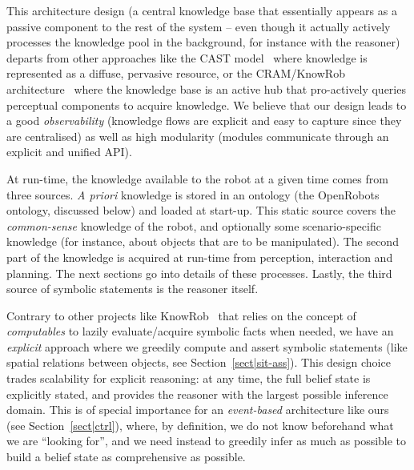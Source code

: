 \documentclass[preprint,3p,times]{elsarticle}
\begin{document}
This architecture design (a central knowledge base that essentially appears as a
passive component to the rest of the system -- even though it actually actively
processes the knowledge pool in the background, for instance with the reasoner)
departs from other approaches like the CAST model~\cite{Hawes2007} where
knowledge is represented as a diffuse, pervasive resource, or the CRAM/KnowRob
architecture~\cite{Beetz2010} where the knowledge base is an active hub that
pro-actively queries perceptual components to acquire knowledge. We believe that
our design leads to a good \emph{observability} (knowledge flows are explicit
and easy to capture since they are centralised) as well as high modularity
(modules communicate through an explicit and unified API).

At run-time, the knowledge available to the robot at a given time comes from
three sources. {\it A priori} knowledge is stored in an ontology (the {\sc
OpenRobots} ontology, discussed below) and loaded at start-up. This static source covers the
\emph{common-sense} knowledge of the robot, and optionally some
scenario-specific knowledge (for instance, about objects that are to be
manipulated). The second part of the knowledge is acquired at run-time from
perception, interaction and planning. The next sections go into details of these
processes.  Lastly, the third source of symbolic statements is the reasoner
itself.

Contrary to other projects like KnowRob~\cite{Tenorth2009a} that relies on
the concept of \emph{computables} to lazily evaluate/acquire symbolic facts when
needed, we have an \emph{explicit} approach where we greedily compute and assert
symbolic statements (like spatial relations between objects, see
Section~\ref{sect|sit-ass}). This design choice trades scalability for explicit
reasoning: at any time, the full belief state is explicitly stated, and
provides the reasoner with the largest possible inference domain. This is of
special importance for an \emph{event-based} architecture like ours (see
Section~\ref{sect|ctrl}), where, by definition, we do not know beforehand what
we are ``looking for'', and we need instead to greedily infer as much as possible
to build a belief state as comprehensive as possible.
\end{document}

